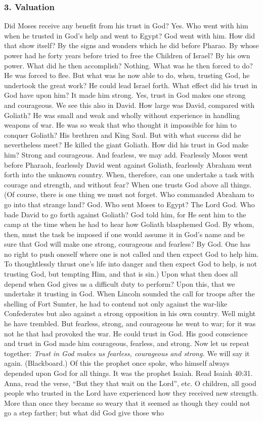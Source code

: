 \subsubsection{3. Valuation} Did Moses receive any benefit from his trust in God? Yes. Who went with him when he trusted in God’s help and went to Egypt? God went with him. How did that show itself? By the signs and wonders which he did before Pharao. By whose power had he forty years before tried to free the Children of Israel? By his own power. What did he then accomplish? Nothing. What was he then forced to do? He was forced to flee. But what was he now able to do, when, trusting God, he undertook the great work? He could lead Israel forth. What effect did his trust in God have upon him? It made him strong. Yes, trust in God makes one strong and
courageous. We see this also in David. How large was David, compared with Goliath? He was small and weak and wholly without experience in handling weapons of war. He was so weak that who thought it impossible for him to conquer Goliath? His brethren and King Saul. But with what success did he nevertheless meet? He killed the giant Goliath. How did his trust in God make him? Strong and courageous. And fearless, we may add. Fearlessly Moses went before Pharaoh, fearlessly David went against Goliath, fearlessly Abraham went forth into the unknown country. When, therefore, can one undertake a task with courage and strength, and without fear? When one trusts God above all things. (Of course, there is one thing we must not forget. Who commanded Abraham to go into that strange land? God. Who sent Moses to Egypt? The Lord God. Who bade David to go forth against Goliath? God told him, for He sent him to the camp at the time when he had to hear how Goliath blasphemed God. By whom, then, must the task be imposed if one would assume it in God’s name and be sure that God will make one strong, courageous and fearless? By God. One has no right to push oneself where one is not called and then expect God to help him. To thoughtlessly thrust one’s life into danger and then expect God to help, is not trusting God, but tempting Him, and that is sin.) Upon what then does all depend when God gives us a difficult duty to perform? Upon this, that we undertake it trusting in God. When Lincoln sounded the call for troops after the shelling of Fort Sumter, he had to contend not only against the war-like Confederates but also against a strong opposition in his own country. Well might he have trembled. But fearless, strong, and courageous he went to war; for it was not he that had provoked the war. He could trust in God. His good conscience and trust in God made him courageous, fearless, and strong. Now let us repeat together: \emph{Trust in God makes us fearless, courageous and strong.} We will say it again. (Blackboard.) Of this the prophet once spoke, who himself always depended upon God for all things. It was the prophet Isaiah. Read Isaiah 40:31. Anna, read the verse, “But they that wait on the Lord”, etc. O children, all good people who trusted in the Lord have experienced how they received new strength. More than once they became so weary that it seemed as though they could not go a step farther; but what did God give those who 